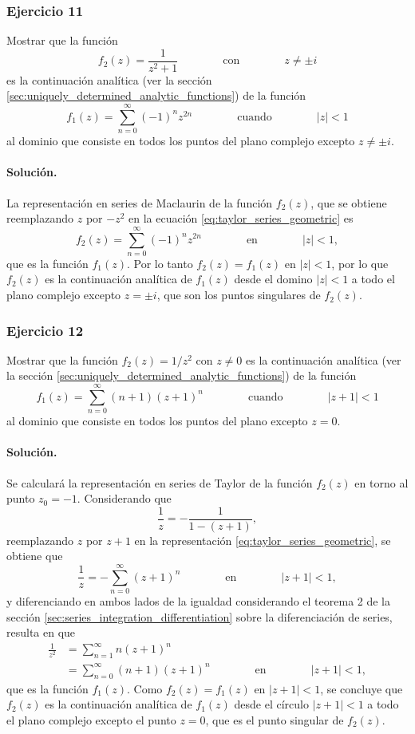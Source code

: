 \documentclass[a4paper]{report}
\begin{document}
\subsubsection*{Ejercicio 11}

Mostrar que la función 
\[
 f_2(z)=\frac{1}{z^2+1}
 \qquad\qquad\textrm{con}\qquad\qquad
 z\neq\pm i
\]
es la continuación analítica (ver la sección \ref{sec:uniquely_determined_analytic_functions}) de la función 
\[
 f_1(z)=\sum_{n=0}^\infty(-1)^nz^{2n}
 \qquad\qquad\textrm{cuando}\qquad\qquad
 |z|<1
\]
al dominio que consiste en todos los puntos del plano complejo excepto \(z\neq\pm i\).

\paragraph{Solución.} La representación en series de Maclaurin de la función \(f_2(z)\), que se obtiene reemplazando \(z\) por \(-z^2\) en la ecuación \ref{eq:taylor_series_geometric} es
\[
 f_2(z)=\sum_{n=0}^\infty(-1)^nz^{2n}
 \qquad\qquad\textrm{en}\qquad\qquad
 |z|<1,
\]
que es la función \(f_1(z)\). Por lo tanto \(f_2(z)=f_1(z)\) en \(|z|<1\), por lo que \(f_2(z)\) es la continuación analítica de \(f_1(z)\) desde el domino \(|z|<1\) a todo el plano complejo excepto \(z=\pm i\), que son los puntos singulares de \(f_2(z)\).

\subsubsection*{Ejercicio 12}

Mostrar que la función \(f_2(z)=1/z^2\) con \(z\neq0\) es la continuación analítica (ver la sección \ref{sec:uniquely_determined_analytic_functions}) de la función
\[
 f_1(z)=\sum_{n=0}^\infty(n+1)(z+1)^n
 \qquad\qquad\textrm{cuando}\qquad\qquad
 |z+1|<1
\]
al dominio que consiste en todos los puntos del plano excepto \(z=0\).

\paragraph{Solución.} Se calculará la representación en series de Taylor de la función \(f_2(z)\) en torno al punto \(z_0=-1\). Considerando que 
\[
 \frac{1}{z}=-\frac{1}{1-(z+1)},
\]
reemplazando \(z\) por \(z+1\) en la representación \ref{eq:taylor_series_geometric}, se obtiene que 
\[
 \frac{1}{z}=-\sum_{n=0}^\infty(z+1)^n
 \qquad\qquad\textrm{en}\qquad\qquad
 |z+1|<1,
\]
y diferenciando en ambos lados de la igualdad considerando el teorema 2 de la sección \ref{sec:series_integration_differentiation} sobre la diferenciación de series, resulta en que 
\begin{align*}
 \frac{1}{z^2}&=\sum_{n=1}^\infty n(z+1)^n\\
   &=\sum_{n=0}^\infty (n+1)(z+1)^n
  \qquad\qquad\textrm{en}\qquad\qquad
  |z+1|<1,
\end{align*}
que es la función \(f_1(z)\). Como \(f_2(z)=f_1(z)\) en \(|z+1|<1\), se concluye que \(f_2(z)\) es la continuación analítica de \(f_1(z)\) desde el círculo \(|z+1|<1\) a todo el plano complejo excepto el punto \(z=0\), que es el punto singular de \(f_2(z)\).
\end{document}
